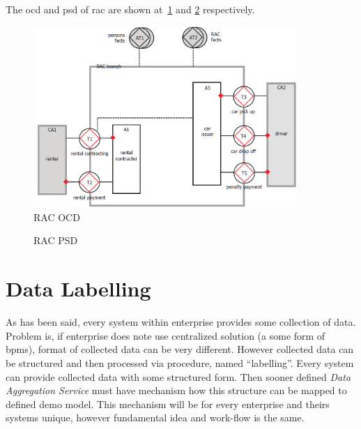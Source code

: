 The \gls{ocd} and \gls{psd} of \gls{rac} are shown at~\cref{fig:rac-ocd} and \cref{fig:rac-psd} respectively.
\begin{figure}[ht!]
\centering
\includegraphics[width=10cm,keepaspectratio]{img/rac-ocd}
\caption{RAC OCD}
\label{fig:rac-ocd}
\end{figure}

\begin{figure}[ht!]
 \centering
 \qquad
 \caption{RAC PSD}%
 \label{fig:rac-psd}%
\end{figure}
\newpage
\section{Data Labelling}
As has been said, every system within enterprise provides some collection of data. Problem is, if enterprise does note use centralized solution (a some form of \gls{bpms}), format of collected data can be very different. 
However collected data can be structured and then processed via procedure, named ``labelling''. Every system can provide collected data with some structured form. Then sooner defined \textit{Data Aggregation Service} must have mechanism how this structure can be mapped to defined \gls{demo} model. This mechanism will be for every enterprise and theirs systems unique, however fundamental idea and work-flow is the same.

